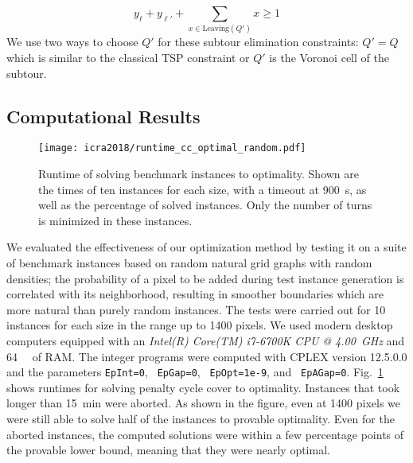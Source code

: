 \begin{equation}
	\displaystyle y_{\ell}+y_{\ell'}+\sum\limits_{x\in \text{Leaving}(Q')} x \geq 1
\end{equation}
We use two ways to choose $Q'$ for 
{these} subtour elimination constraints:
	$Q'=Q$ which is similar to the classical TSP constraint or 
	$Q'$ is the Voronoi cell of the subtour. %

\subsection{Computational Results}
\label{subsec:computational}

\begin{figure}[h]
	\texttt{[image: icra2018/runtime\_cc\_optimal\_random.pdf]}
	\caption{Runtime of solving benchmark instances to optimality. Shown
	are the times of ten instances for each size, with a timeout at \SI{900}{\second}, as
well as the percentage of solved instances. Only the number of turns is minimized in these instances.} \label{fig:experimentsfromthesis}
\vspace{-1em}
\end{figure}

We evaluated the effectiveness of our optimization method by testing it on a suite of benchmark instances based on
random natural grid graphs with random densities; %
the probability of a pixel to be added during test instance generation is correlated with its neighborhood, resulting in smoother boundaries which are more natural than purely random instances.
The tests were carried out for \num{10} instances for each size in the range up to \num{1400} pixels. 
We used modern desktop computers equipped with an \emph{Intel(R) 
Core(TM) i7-6700K CPU @ \SI{4.00}{\giga\Hz}} and \SI{64}{\giga\byte} of RAM. The integer programs were computed with CPLEX version 12.5.0.0 
and the parameters \texttt{EpInt=0}, \texttt{ EpGap=0}, \texttt{ EpOpt=1e-9}, and \texttt{ EpAGap=0}.
Fig.~\ref{fig:experimentsfromthesis} shows runtimes for solving penalty cycle cover to optimality. 
Instances that took longer than \SI{15}{\minute} were aborted.
As shown in the figure, 
even at \num{1400} pixels we were still able to solve half of the instances to provable optimality.
Even for the aborted instances, the computed solutions were within a few percentage points of
the provable lower bound, meaning that they were nearly optimal.

